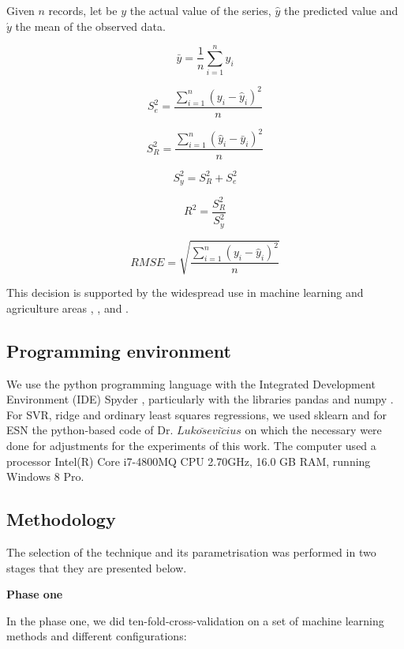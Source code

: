 \documentclass[review,authoryear,english]{elsarticle}
\begin{document}
Given $n$ records, let be $y$ the actual value of the series, $\hat{y}$ the predicted value and $\acute{y}$ the mean of the observed data.

$$ \bar{y} = \frac{1}{n} \sum_{i=1}^{n} y_i $$

$$ S_e^2 = \frac{\sum_{i=1}^{n} {(y_i-\hat{y}_i)}^2 }{n}$$

$$ S_R^2 = \frac{\sum_{i=1}^{n} {(\hat{y}_i-\bar{y}_i)}^2 }{n}$$

$$ S_y^2 = S_R^2 + S_e^2$$

$$ R^2 = \frac{S_R^2}{S_y^2}$$

$$ RMSE = \sqrt{\frac{\sum_{i=1}^{n} {(y_i-\hat{y}_i)}^2 }{n}}$$
	
This decision is supported by the widespread use in machine learning and agriculture areas \citep{Soares2014}, \citep{Soares2013}, \citep{Ibrahim2014} and \citep{Demir2014}.  

\subsection{Programming environment}

We use the python programming language with the Integrated Development Environment (IDE) Spyder \citep{Continuum2015}, particularly with the libraries pandas \citep{mckinneypandas2010} and numpy \citep{vanderWalt2011}. For SVR, ridge and ordinary least squares regressions, we used sklearn \citep{scikitlearn2011} and for ESN the python-based code of Dr. $Luko\breve{s} evi \breve{c} ius$ \citep{Lukose2012} on which the necessary were done for adjustments for the experiments of this work. The computer used a processor Intel(R) Core i7-4800MQ CPU 2.70GHz, 16.0 GB RAM, running Windows 8 Pro.

\subsection{Methodology}
The selection of the technique and its parametrisation was performed in two stages that they are presented below.

{\bf Phase one } 

In the phase one, we did ten-fold-cross-validation on a set of  machine learning methods and different configurations:
\end{document}
